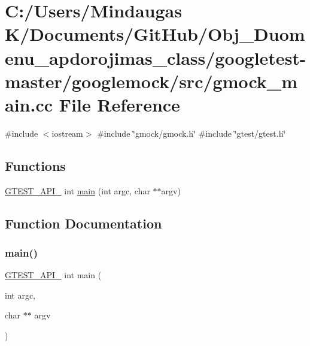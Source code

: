 \hypertarget{googletest-master_2googlemock_2src_2gmock__main_8cc}{}\section{C\+:/\+Users/\+Mindaugas K/\+Documents/\+Git\+Hub/\+Obj\+\_\+\+Duomenu\+\_\+apdorojimas\+\_\+class/googletest-\/master/googlemock/src/gmock\+\_\+main.cc File Reference}
\label{googletest-master_2googlemock_2src_2gmock__main_8cc}
{\ttfamily \#include $<$iostream$>$}\newline
{\ttfamily \#include \char`\"{}gmock/gmock.\+h\char`\"{}}\newline
{\ttfamily \#include \char`\"{}gtest/gtest.\+h\char`\"{}}\newline
\subsection*{Functions}
\begin{DoxyCompactItemize}
\item 
\mbox{\hyperlink{_obj__test_2lib_2googletest-release-1_88_81_2googletest_2include_2gtest_2internal_2gtest-port_8h_aa73be6f0ba4a7456180a94904ce17790}{G\+T\+E\+S\+T\+\_\+\+A\+P\+I\+\_\+}} int \mbox{\hyperlink{googletest-master_2googlemock_2src_2gmock__main_8cc_a7f83bdc516d2cb86e20235d94ddf055a}{main}} (int argc, char $\ast$$\ast$argv)
\end{DoxyCompactItemize}


\subsection{Function Documentation}
\mbox{\label{googletest-master_2googlemock_2src_2gmock__main_8cc_a7f83bdc516d2cb86e20235d94ddf055a}} 
\subsubsection{\texorpdfstring{main()}{main()}}
{\footnotesize\ttfamily \mbox{\hyperlink{_obj__test_2lib_2googletest-release-1_88_81_2googletest_2include_2gtest_2internal_2gtest-port_8h_aa73be6f0ba4a7456180a94904ce17790}{G\+T\+E\+S\+T\+\_\+\+A\+P\+I\+\_\+}} int main (\begin{DoxyParamCaption}\item[{int}]{argc,  }\item[{char $\ast$$\ast$}]{argv }\end{DoxyParamCaption})}

